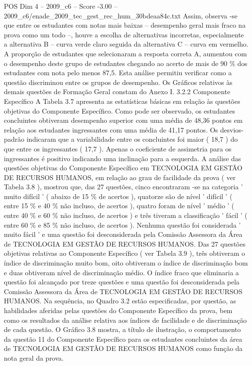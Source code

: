 \begin{textsample}{POS Dim 4 – 2009\_c6 – Score -3.00 – 2009\_c6/enade\_2009\_tec\_gest\_rec\_hum\_30bdeaa84c.txt}
Assim, observa -se que entre os estudantes com notas mais baixas – desempenho geral mais fraco na prova como um todo –, houve a escolha de alternativas incorretas, especialmente a alternativa B – curva verde claro seguida da alternativa C – curva em vermelho.
A proporção de estudantes que selecionaram a resposta correta A, aumentou com o desempenho deste grupo de estudantes chegando ao acerto de mais de 90 \% dos estudantes com nota pelo menos 87,5.
Esta análise permitiu verificar como a questão discriminou entre os grupos de desempenho.
Os Gráficos relativos às demais questões de Formação Geral constam do Anexo I. 3.2.2 Componente Específico A Tabela 3.7 apresenta as estatísticas básicas em relação às questões objetivas do Componente Específico.
Como pode ser observado, os estudantes concluintes obtiveram desempenho superior com uma média de 48,36 pontos em relação aos estudantes ingressantes com uma média de 41,17 pontos.
Os desvios-padrão indicaram que a variabilidade entre os concluintes foi maior ( 18,7 ) do que entre os ingressantes ( 17,7 ).
Apenas o coeficiente de assimetria para os ingressantes é positivo indicando uma inclinação para a esquerda.
A análise das questões objetivas do Componente Específico em TECNOLOGIA EM GESTÃO DE RECURSOS HUMANOS, em relação ao grau de facilidade da prova ( ver Tabela 3.8 ), mostrou que, das 27 questões, cinco encontraram -se na categoria ' muito difícil ' ( abaixo de 15 \% de acertos ), quatorze são de nível ' difícil ' ( entre 15 \% e 40 \% não incluso, de acertos ), quatro foram de nível ' médio ' ( entre 40 \% e 60 \% não incluso, de acertos ) e três tiveram a classificação ' fácil ' ( entre 60 \% e 85 \% não incluso, de acertos ).
Nenhuma questão foi considerada ' muito fácil ' e uma questão foi desconsiderada pela Comissão Assessora da Área de TECNOLOGIA EM GESTÃO DE RECURSOS HUMANOS.
Das 27 questões objetivas relativas ao Componente Específico ( ver Tabela 3.9 ), três obtiveram o índice de discriminação muito bom, oito obtiveram o índice de discriminação bom e duas obtiveram nível de discriminação médio.
O índice fraco que eliminaria a questão foi alcançado por treze questões e uma questão foi desconsiderada pela Comissão Assessora da Área de TECNOLOGIA EM GESTÃO DE RECURSOS HUMANOS.
Na sequência, no Quadro 3.2 estão especificadas, por questão, as habilidades aferidas pelas questões do Componente Específico da prova, bem como os resultados da análise relativa aos índices de facilidade e de discriminação de cada questão.
O Gráfico 3.8 mostra, a título de ilustração, o comportamento da questão 11 do Componente Específico para os estudantes concluintes da área de TECNOLOGIA EM GESTÃO DE RECURSOS HUMANOS como função da nota geral da prova.

\end{textsample}
